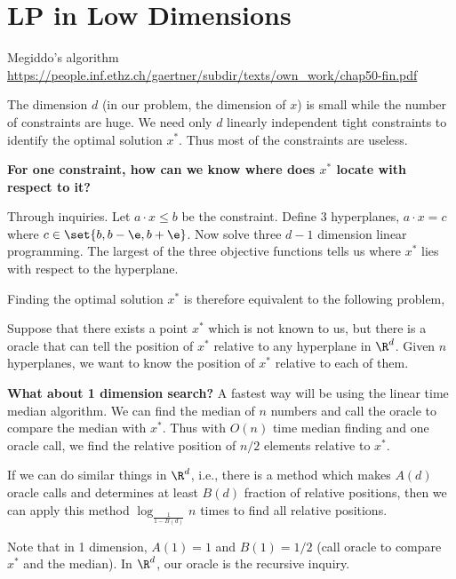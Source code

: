 \documentclass{beamer}
\begin{document}
\section{LP in Low Dimensions}
\begin{frame}[allowframebreaks]{Megiddo's algorithm}
    {\tiny \url{https://people.inf.ethz.ch/gaertner/subdir/texts/own_work/chap50-fin.pdf}}

    The dimension $d$ (in our problem, the dimension of $x$) is small while the number of constraints are huge. We need only $d$ linearly independent tight constraints to identify the optimal solution $x^*$.
    Thus most of the constraints are useless.
    \BlankLine


    \textbf{For one constraint, how can we know where does $x^*$ locate with respect to it?}

    Through inquiries. Let $a\cdot x \leq b$ be the constraint. Define 3 hyperplanes, $a\cdot x = c$ where $c\in \set{b,b-\e,b+\e}$. Now solve three $d-1$ dimension linear programming. The largest of the three objective functions tells us where $x^*$ lies with respect to the
    hyperplane.

    \newpage
    Finding the optimal solution $x^*$ is therefore equivalent to the following problem,
    \begin{problem}
        Suppose that there exists a point $x^*$ which is not known to us, but there is a oracle that can tell the position of $x^*$ relative to any hyperplane in $\R^d$. Given $n$ hyperplanes, we want to know the position of $x^*$ relative to each of them.
    \end{problem}

    \textbf{What about 1 dimension search?} A fastest way will be using the linear time median algorithm. We can find the median of $n$ numbers and call the oracle to compare the median with $x^*$. Thus with $O(n)$ time median finding and one oracle call, we find the relative position of $n/2$ elements relative to $x^*$.

    \newpage

    If we can do similar things in $\R^d$, i.e., there is a method which makes $A(d)$ oracle calls and determines at least $B(d)$ fraction of relative positions, then we can apply this method $\log_{\frac{1}{1-B(d)}} n$ times to find all relative positions.

    Note that in 1 dimension, $A(1)=1$ and $B(1)=1/2$ (call oracle to compare $x^*$ and the median). In $\R^d$, our oracle is the recursive inquiry.


\end{frame}
\end{document}
